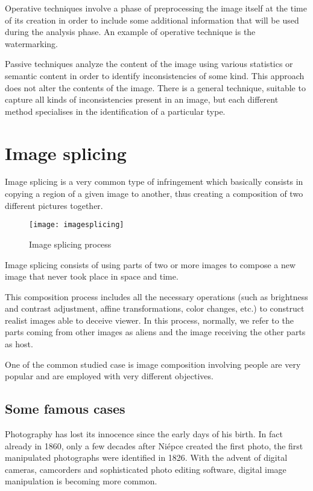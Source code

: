 Operative techniques involve a phase of preprocessing the image itself at the time of its creation in order to include some additional information that will be used during the analysis phase. An example of operative technique is the watermarking.

Passive techniques analyze the content of the image using various statistics or semantic content in order to identify inconsistencies of some kind. This approach does not alter the contents of the image.
There is a general technique, suitable to capture all kinds of inconsistencies present in an image, but each different method specialises in the identification of a particular type.

\section{Image splicing}

Image splicing is a very common type of infringement which basically consists in copying a region of a given image to another, thus creating a composition of two different pictures together.

\begin{figure}
  \centering
    \texttt{[image: imagesplicing]}
    \caption{Image splicing process}
\end{figure}

Image splicing consists of using parts of two or more images to compose a new image that never took place in space and time. 

This composition process includes all the necessary operations (such as brightness and contrast adjustment, affine transformations, color changes, etc.) to construct realist images able to deceive viewer. In this process, normally, we refer to the parts coming from other images as aliens and the image receiving the other parts as host.

One of the common studied case is image composition involving people are very popular and are employed with very different objectives. 

\subsection{Some famous cases}

Photography has lost its innocence since the early days of his birth. In fact already in 1860, only a few decades after Niépce created the first photo, the first manipulated photographs were identified in 1826. With the advent of digital cameras, camcorders and sophisticated photo editing software, digital image manipulation is becoming more common. 

